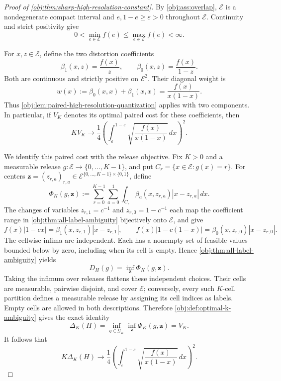 \documentclass[11pt]{article}
\begin{document}
\begin{proof}[Proof of \cref{obj:thm:sharp-high-resolution-constant}]
By \cref{obj:ass:overlap}, \(\mathcal E\) is a nondegenerate compact interval and \(e,1-e\geq\varepsilon>0\) throughout \(\mathcal E\). Continuity and strict positivity give
\[
0<\min_{e\in\mathcal E}f(e)
\leq\max_{e\in\mathcal E}f(e)<\infty.
\]

For \(x,z\in\mathcal E\), define the two distortion coefficients
\[
\beta_1(x,z)=\frac{f(x)}{z},
\qquad
\beta_0(x,z)=\frac{f(x)}{1-z}.
\]
Both are continuous and strictly positive on \(\mathcal E^2\). Their diagonal weight is
\[
w(x):=\beta_0(x,x)+\beta_1(x,x)
=\frac{f(x)}{x(1-x)}.
\]
Thus \cref{obj:lem:paired-high-resolution-quantization} applies with two components. In particular, if \(V_K\) denotes its optimal paired cost for these coefficients, then
\[
K V_K\longrightarrow
\frac14\left(\int_{\varepsilon}^{1-\varepsilon}
\sqrt{\frac{f(x)}{x(1-x)}}\,dx\right)^2.
\]

We identify this paired cost with the release objective. Fix \(K>0\) and a measurable release \(g:\mathcal E\to\{0,\ldots,K-1\}\), and put \(C_r=\{x\in\mathcal E:g(x)=r\}\). For centers \(\mathbf z=(z_{r,a})_{r,a}\in\mathcal E^{\{0,\ldots,K-1\}\times\{0,1\}}\), define
\[
\Phi_K(g,\mathbf z)
:=
\sum_{r=0}^{K-1}\sum_{a=0}^{1}
\int_{C_r}\beta_a(x,z_{r,a})|x-z_{r,a}|\,dx.
\]
The changes of variables \(z_{r,1}=c^{-1}\) and \(z_{r,0}=1-c^{-1}\) each map the coefficient range in \cref{obj:thm:all-label-ambiguity} bijectively onto \(\mathcal E\), and give
\[
f(x)|1-cx|
=\beta_1(x,z_{r,1})|x-z_{r,1}|,
\qquad
f(x)|1-c(1-x)|
=\beta_0(x,z_{r,0})|x-z_{r,0}|.
\]
The cellwise infima are independent. Each has a nonempty set of feasible values bounded below by zero, including when its cell is empty. Hence \cref{obj:thm:all-label-ambiguity} yields
\[
D_H(g)=\inf_{\mathbf z}\Phi_K(g,\mathbf z).
\]
Taking the infimum over releases flattens these independent choices. Their cells are measurable, pairwise disjoint, and cover \(\mathcal E\); conversely, every such \(K\)-cell partition defines a measurable release by assigning its cell indices as labels. Empty cells are allowed in both descriptions. Therefore \cref{obj:def:optimal-k-ambiguity} gives the exact identity
\[
\Delta_K(H)
=\inf_{g\in\mathcal G_K}\inf_{\mathbf z}\Phi_K(g,\mathbf z)
=V_K.
\]
It follows that
\[
K\Delta_K(H)\longrightarrow
\frac14\left(\int_{\varepsilon}^{1-\varepsilon}
\sqrt{\frac{f(x)}{x(1-x)}}\,dx\right)^2.
\]


\end{proof}
\end{document}
